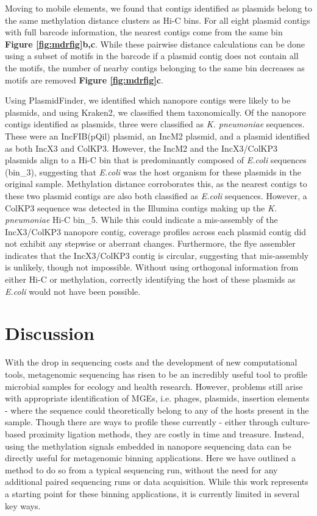 Moving to mobile elements, we found that contigs identified as plasmids belong to the same methylation distance clusters as Hi-C bins.  For all eight plasmid contigs with full barcode information,  the nearest contigs come from the same bin {\bf Figure \ref{fig:mdrfig}b,c}. While these pairwise distance calculations can be done using a subset of motifs in the barcode if a plasmid contig does not contain all the motifs, the number of nearby contigs belonging to the same bin decreases as motifs are removed {\bf Figure \ref{fig:mdrfig}c}.

Using PlasmidFinder, we identified which nanopore contigs were likely to be plasmids, and using Kraken2, we classified them taxonomically. Of the nanopore contigs identified as plasmids, three were classified as \textit{K. pneumoniae} sequences. These were an IncFIB(pQil) plasmid, an IncM2 plasmid, and a plasmid identified as both IncX3 and ColKP3. However, the IncM2 and the IncX3/ColKP3 plasmids align to a Hi-C bin that is predominantly composed of \textit{E.coli} sequences (bin\_3), suggesting that \textit{E.coli} was the host organism for these plasmids in the original sample. Methylation distance corroborates this, as the nearest contigs to these two plasmid contigs are also both classified as \textit{E.coli} sequences. However, a ColKP3 sequence was detected in the Illumina contigs making up the \textit{K. pneumoniae} Hi-C bin\_5. While this could indicate a mis-assembly of the IncX3/ColKP3 nanopore contig, coverage profiles across each plasmid contig did not exhibit any stepwise or aberrant changes. Furthermore, the flye assembler indicates that the IncX3/ColKP3 contig is circular, suggesting that mis-assembly is unlikely, though not impossible. Without using orthogonal information from either Hi-C or methylation, correctly identifying the host of these plasmids as \textit{E.coli} would not have been possible.

\section{Discussion}
\label{sec:discuss}

With the drop in sequencing costs and the development of new computational tools, metagenomic sequencing has risen to be an incredibly useful tool to profile microbial samples for ecology and health research. However, problems still arise with appropriate identification of MGEs, i.e. phages, plasmids, insertion elements - where the sequence could theoretically belong to any of the hosts present in the sample. Though there are ways to profile these currently - either through culture-based proximity ligation methods, they are costly in time and treasure. Instead, using the methylation signals embedded in nanopore sequencing data can be directly useful for metagenomic binning applications. Here we have outlined a method to do so from a typical sequencing run, without the need for any additional paired sequencing runs or data acquisition. While this work represents a starting point for these binning applications, it is currently limited in several key ways.

